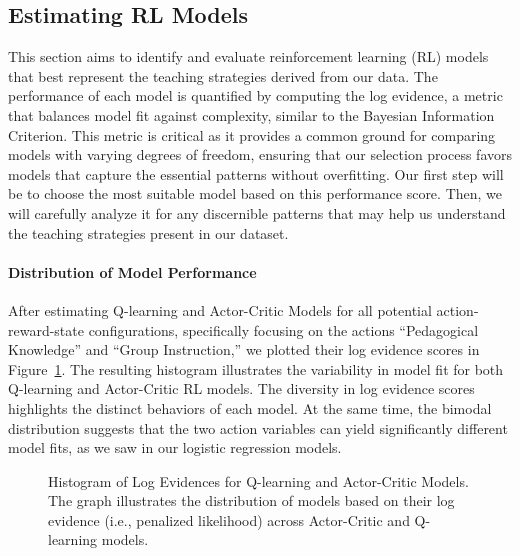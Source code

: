 \documentclass[
  number,
  preprint,
  3p,
  onecolumn]{elsarticle}
\let\oldparagraph\paragraph
\renewcommand{\paragraph}[1]{\oldparagraph{#1}\mbox{}}
\begin{document}
\subsection{Estimating RL Models}\label{estimating-rl-models}

This section aims to identify and evaluate reinforcement learning (RL)
models that best represent the teaching strategies derived from our
data. The performance of each model is quantified by computing the log
evidence, a metric that balances model fit against complexity, similar
to the Bayesian Information Criterion. This metric is critical as it
provides a common ground for comparing models with varying degrees of
freedom, ensuring that our selection process favors models that capture
the essential patterns without overfitting. Our first step will be to
choose the most suitable model based on this performance score. Then, we
will carefully analyze it for any discernible patterns that may help us
understand the teaching strategies present in our dataset.

\paragraph{Distribution of Model
Performance}\label{distribution-of-model-performance}

After estimating Q-learning and Actor-Critic Models for all potential
action-reward-state configurations, specifically focusing on the actions
``Pedagogical Knowledge'' and ``Group Instruction,'' we plotted their
log evidence scores in Figure~\ref{fig-log-evidence-histogram}. The
resulting histogram illustrates the variability in model fit for both
Q-learning and Actor-Critic RL models. The diversity in log evidence
scores highlights the distinct behaviors of each model. At the same
time, the bimodal distribution suggests that the two action variables
can yield significantly different model fits, as we saw in our logistic
regression models.

\begin{figure}


\caption{\label{fig-log-evidence-histogram}Histogram of Log Evidences
for Q-learning and Actor-Critic Models. The graph illustrates the
distribution of models based on their log evidence (i.e., penalized
likelihood) across Actor-Critic and Q-learning models.}

\end{figure}%
\end{document}
